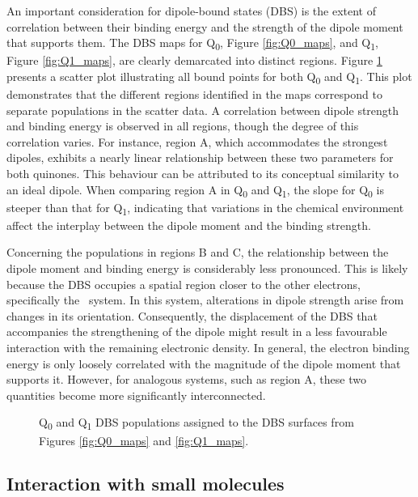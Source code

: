An important consideration for dipole-bound states (DBS) is the extent of correlation between their binding energy and the strength of the dipole moment that supports them. The DBS maps for Q\textsubscript{0}, Figure \ref{fig:Q0_maps}, and Q\textsubscript{1}, Figure \ref{fig:Q1_maps}, are clearly demarcated into distinct regions. Figure \ref{fig:D_vsDBS} presents a scatter plot illustrating all bound points for both Q\textsubscript{0} and Q\textsubscript{1}. This plot demonstrates that the different regions identified in the maps correspond to separate populations in the scatter data. A correlation between dipole strength and binding energy is observed in all regions, though the degree of this correlation varies. For instance, region A, which accommodates the strongest dipoles, exhibits a nearly linear relationship between these two parameters for both quinones. This behaviour can be attributed to its conceptual similarity to an ideal dipole. When comparing region A in Q\textsubscript{0} and Q\textsubscript{1}, the slope for Q\textsubscript{0} is steeper than that for Q\textsubscript{1}, indicating that variations in the chemical environment affect the interplay between the dipole moment and the binding strength.

Concerning the populations in regions B and C, the relationship between the dipole moment and binding energy is considerably less pronounced. This is likely because the DBS occupies a spatial region closer to the other electrons, specifically the \textpi\ system. In this system, alterations in dipole strength arise from changes in its orientation. Consequently, the displacement of the DBS that accompanies the strengthening of the dipole might result in a less favourable interaction with the remaining electronic density.
In general, the electron binding energy is only loosely correlated with the magnitude of the dipole moment that supports it. However, for analogous systems, such as region A, these two quantities become more significantly interconnected.

\begin{figure}[th!]
    \centering
    \small
     
    \caption[Q\textsubscript{0} and Q\textsubscript{1} DBS populations]{Q\textsubscript{0} and Q\textsubscript{1} DBS populations assigned to the DBS surfaces from Figures \ref{fig:Q0_maps} and \ref{fig:Q1_maps}.}
    \label{fig:D_vsDBS}
\end{figure}

\subsection{Interaction with small molecules}

